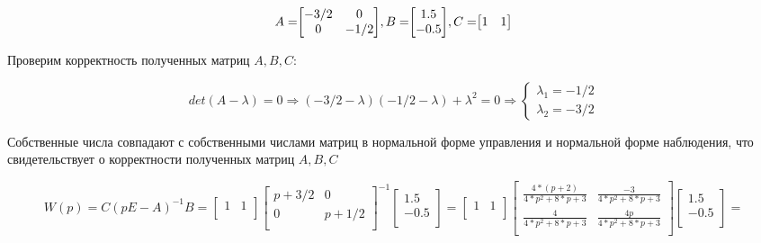 \documentclass[14pt,a4paper,report]{report}
\begin{document}
\begin{equation*}
\text{$A=$}
\text{$
	\begin{bmatrix}
	-3/2 & 0 \\
	0 & -1/2 \\
	\end{bmatrix}
	$}
\text{$, B=$}
\text{$
	\begin{bmatrix}
	1.5 \\
	-0.5 \\
	\end{bmatrix}
	$}
\text{$, C=$}
\text{$
	\begin{bmatrix}
	1 & 1 \\
	\end{bmatrix}
	$}
\end{equation*}

Проверим корректность полученных матриц $A, B, C$:

\begin{equation*}
\text{$det(A-\lambda)=0$}
\Longrightarrow
	\text{$(-3/2-\lambda)(-1/2-\lambda) + \lambda^2=0$}
\Longrightarrow
\begin{cases}
	\text{$\lambda_1=-1/2$} \\
	\text{$\lambda_2=-3/2$}
\end{cases}
\end{equation*}

Собственные числа совпадают с собственными числами матриц в нормальной форме управления и нормальной форме наблюдения, что свидетельствует о корректности полученных матриц  $A, B, C$

\begin{equation*}
\text{$W(p)=C(pE-A)^{-1}B=
	\begin{bmatrix}
	1 & 1 \\
	\end{bmatrix}
	\begin{bmatrix}
	p+3/2 & 0 \\
	0 & p+1/2\\
	\end{bmatrix}^{-1}
	\begin{bmatrix}
	1.5 \\
	-0.5 \\
	\end{bmatrix}=
	\begin{bmatrix}
	1 & 1 \\
	\end{bmatrix}
	\begin{bmatrix}
	\frac{4*(p + 2)}{4*p^2 + 8*p + 3} & \frac{-3}{4*p^2 + 8*p + 3} \\
	\frac{4}{4*p^2 + 8*p + 3} & \frac{4p}{4*p^2 + 8*p + 3}\\
	\end{bmatrix}
	\begin{bmatrix}
	1.5 \\
	-0.5 \\
	\end{bmatrix}=
	$}
\end{equation*}
\end{document}
